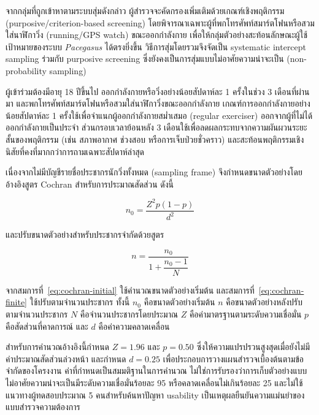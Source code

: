 จากกลุ่มที่ถูกเข้าหาตามระบบสุ่มดังกล่าว ผู้สำรวจจะคัดกรองเพิ่มเติมด้วยเกณฑ์เชิงพฤติกรรม (purposive/criterion-based screening) โดยพิจารณาเฉพาะผู้ที่พกโทรศัพท์สมาร์ตโฟนหรือสวมใส่นาฬิกาวิ่ง (running/GPS watch) ขณะออกกำลังกาย เพื่อให้กลุ่มตัวอย่างสะท้อนลักษณะผู้ใช้เป้าหมายของระบบ \textit{Pacegasus} ได้ตรงยิ่งขึ้น วิธีการสุ่มโดยรวมจึงจัดเป็น systematic intercept sampling ร่วมกับ purposive screening ซึ่งยังคงเป็นการสุ่มแบบไม่อาศัยความน่าจะเป็น (non-probability sampling)

ผู้เข้าร่วมต้องมีอายุ 18 ปีขึ้นไป ออกกำลังกายหรือวิ่งอย่างน้อยสัปดาห์ละ 1 ครั้งในช่วง 3 เดือนที่ผ่านมา และพกโทรศัพท์สมาร์ตโฟนหรือสวมใส่นาฬิกาวิ่งขณะออกกำลังกาย เกณฑ์การออกกำลังกายอย่างน้อยสัปดาห์ละ 1 ครั้งใช้เพื่อจำแนกผู้ออกกำลังกายสม่ำเสมอ (regular exerciser) ออกจากผู้ที่ไม่ได้ออกกำลังกายเป็นประจำ \cite{childs2014} ส่วนกรอบเวลาย้อนหลัง 3 เดือนใช้เพื่อลดผลกระทบจากความผันผวนระยะสั้นของพฤติกรรม (เช่น สภาพอากาศ ช่วงสอบ หรือการเจ็บป่วยชั่วคราว) และสะท้อนพฤติกรรมเชิงนิสัยที่คงที่มากกว่าการถามเฉพาะสัปดาห์ล่าสุด

เนื่องจากไม่มีบัญชีรายชื่อประชากรนักวิ่งทั้งหมด (sampling frame) จึงกำหนดขนาดตัวอย่างโดยอ้างอิงสูตร Cochran สำหรับการประมาณสัดส่วน \cite{cochran1977} ดังนี้

\begin{equation}\label{eq:cochran-initial}
    n_0 = \dfrac{Z^2p(1-p)}{d^2}
\end{equation}

และปรับขนาดตัวอย่างสำหรับประชากรจำกัดด้วยสูตร

\begin{equation}\label{eq:cochran-finite}
    n = \dfrac{n_0}{1+\dfrac{n_0-1}{N}}
\end{equation}

จากสมการที่~\eqref{eq:cochran-initial} ใช้คำนวณขนาดตัวอย่างเริ่มต้น และสมการที่~\eqref{eq:cochran-finite} ใช้ปรับตามจำนวนประชากร ทั้งนี้ $n_0$ คือขนาดตัวอย่างเริ่มต้น $n$ คือขนาดตัวอย่างหลังปรับตามจำนวนประชากร $N$ คือจำนวนประชากรโดยประมาณ $Z$ คือค่ามาตรฐานตามระดับความเชื่อมั่น $p$ คือสัดส่วนที่คาดการณ์ และ $d$ คือค่าความคลาดเคลื่อน

สำหรับการคำนวณอ้างอิงนี้กำหนด $Z=1.96$ และ $p=0.50$ ซึ่งให้ความแปรปรวนสูงสุดเมื่อยังไม่มีค่าประมาณสัดส่วนล่วงหน้า และกำหนด $d=0.25$ เพื่อประกอบการวางแผนสำรวจเบื้องต้นตามข้อจำกัดของโครงงาน ค่าที่กำหนดเป็นสมมติฐานในการคำนวณ ไม่ใช่การรับรองว่าการเก็บตัวอย่างแบบไม่อาศัยความน่าจะเป็นมีระดับความเชื่อมั่นร้อยละ 95 หรือคลาดเคลื่อนไม่เกินร้อยละ 25 และไม่ใช้แนวทางผู้ทดสอบประมาณ 5 คนสำหรับค้นหาปัญหา usability เป็นเหตุผลยืนยันความแม่นยำของแบบสำรวจความต้องการ \cite{cochran1977,budiu2021five}

